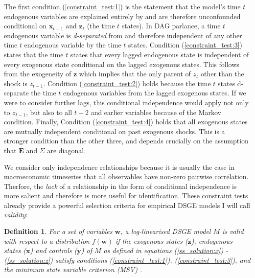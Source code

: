 \documentclass{article}
\newtheorem{definition}{Definition}
\begin{document}
The first condition (\ref{constraint_test:1}) is the statement that the model's time $t$ endogenous variables are explained entirely by and are therefore unconfounded conditional on $\mathbf{x}_{t-1}$ and $\mathbf{z}_t$ (the time $t$ states). In DAG parlance, a time $t$ endogenous variable is \textit{d-separated} from and therefore independent of any other time $t$ endogenous variable by the time $t$ states. Condition (\ref{constraint_test:3}) states that the time $t$ states that every lagged endogenous state is independent of every exogenous state conditional on the lagged exogenous states. This follows from the exogeneity of $\mathbf{z}$ which implies that the only parent of $z_t$ other than the shock is $z_{t-1}$. Condition (\ref{constraint_test:2}) holds because the time $t$ states d-separate the time $t$ endogenous variables from the lagged exogenous states. If we were to consider further lags, this conditional independence would apply not only to $z_{t-1}$, but also to all $t-2$ and earlier variables because of the Markov condition. Finally, Condition (\ref{constraint_test:4}) holds that all exogenous states are mutually independent conditional on past exogenous shocks. This is a stronger condition than the other three, and depends crucially on the assumption that $\mathbf{E}$ and $\Sigma$ are diagonal.

We consider only independence relationships because it is usually the case in macroeconomic timeseries that all observables have non-zero pairwise correlation. Therfore, the \textit{lack} of a relationship in the form of conditional independence is more salient and therefore is more useful for identification. These constraint tests already provide a powerful selection criteria for empirical DSGE models I will call \textit{validity}:

\begin{definition}
  For a set of variables $\mathbf{w}$, a log-linearised DSGE model $M$ is \textit{valid} with respect to a distribution $f(\mathbf{w})$ if the exogenous states ($\mathbf{z}$), endogenous states ($\mathbf{x}$) and controls ($\mathbf{y}$) of $M$ as defined in equations (\ref{ss_solution:x}) - (\ref{ss_solution:z}) satisfy conditions (\ref{constraint_test:1}), (\ref{constraint_test:3}), and the minimum state variable criterion (MSV) \parencite{mccallum1999role}.
  \label{validity}
\end{definition}
\end{document}
